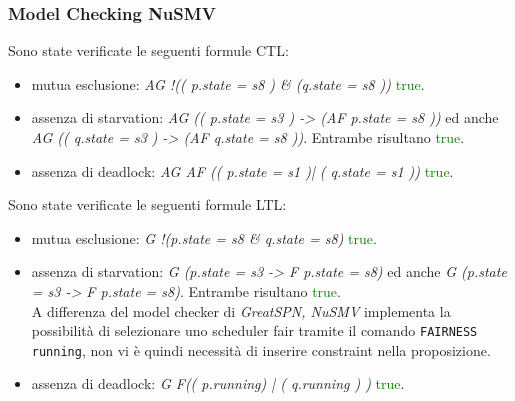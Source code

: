 \documentclass[a4paper]{article}
\begin{document}
\subsubsection{Model Checking NuSMV}
Sono state verificate le seguenti formule CTL:
\begin{itemize}
        \item mutua esclusione: \textit{AG !(( p.state = s8 ) \& (q.state = s8 ))} \textcolor{green}{true}.
        \item assenza di starvation: \textit{AG (( p.state = s3 ) -> (AF p.state = s8 ))} ed anche \textit{AG (( q.state = s3 ) -> (AF q.state = s8 ))}. Entrambe risultano \textcolor{green}{true}.
        \item assenza di deadlock: \textit{AG AF (( p.state = s1 )| ( q.state = s1 ))} \textcolor{green}{true}.
\end{itemize}
Sono state verificate le seguenti formule LTL:
\begin{itemize}
        \item mutua esclusione: \textit{G !(p.state = s8 \& q.state = s8)} \textcolor{green}{true}.\\
        \item assenza di starvation: \textit{G (p.state = s3 ->  F p.state = s8)} ed anche \textit{G (p.state = s3 ->  F p.state = s8)}. Entrambe risultano \textcolor{green}{true}.\\
		A differenza del model checker di \textit{GreatSPN, NuSMV} implementa la possibilità di selezionare uno scheduler fair tramite il comando \texttt{FAIRNESS running}, non vi è quindi necessità di inserire constraint nella proposizione.
        \item assenza di deadlock: \textit{G F(( p.running) | ( q.running ) )} \textcolor{green}{true}. 
\end{itemize}
\end{document}
